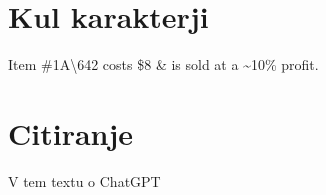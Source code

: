 \documentclass{article}
\begin{document}
\section{Kul karakterji}

Item \#1A\textbackslash642 costs \$8 \& is sold at a \~{}10\% profit.

\section{Citiranje}
V tem textu o ChatGPT \cite{ray2023chatgpt}



\end{document}
